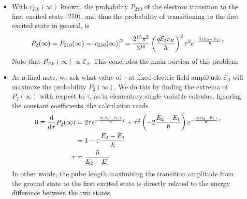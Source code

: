 \documentclass[11pt, a4paper]{article}
\newcommand{\E}{\mathcal{E}}  %
\begin{document}
\begin{itemize}
	\item With $ c_{210}(\infty) $ known, the probability $ P_{210} $ of the electron transition to the first excited state $ \ket{210} $, and thus the probability of transitioning to the first excited state in general, is
	\begin{equation*}
		P_{2}(\infty) = P_{210}(\infty) = \abs{c_{210}(\infty)}^{2} = \frac{2^{15}\pi^{2}}{3^{10}}\left(\frac{q\E_{0}r_{B}}{\hbar}\right)^{2} \tau^{2}e^{-\frac{2(E_{2} - E_{1})}{\hbar}\tau}
	\end{equation*}
	Note that $ P_{210}(\infty)  \propto \E_{0} $. This concludes the main portion of this problem.
		
	\item As a final note, we ask what value of $ \tau $ at fixed electric field amplitude $ \E_{0} $ will maximize the probability $ P_{2}(\infty) $. We do this by finding the extrema of  $ P_{2}(\infty) $ with respect to $ \tau $, as in elementary single variable calculus. Ignoring the constant coefficients, the calculation reads
	\begin{align*}
		 0 \equiv \dv{\tau}P_{2}(\infty) & = 2 \tau e^{-\frac{2(E_{2} - E_{1})}{\hbar}\tau} + \tau^{2}\left(-2\frac{E_{2}- E_{1}}{\hbar}\right)e^{-\frac{2(E_{2} - E_{1})}{\hbar}\tau}\\
		& = 1 - \tau \frac{E_{2}-E_{1}}{\hbar}\\
		 \tau &= \frac{\hbar}{E_{2} - E_{1}}
	\end{align*}
	In other words, the pulse length maximizing the transition amplitude from the ground state to the first excited state is directly related to the energy difference between the two states. 
	
\end{itemize}
\end{document}
